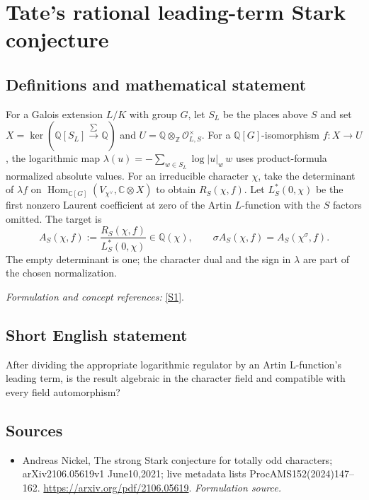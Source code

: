 \documentclass[11pt]{article}
\begin{document}
\section*{\texorpdfstring{Tate's rational leading-term Stark conjecture}{Tate's rational leading-term Stark conjecture}}\label{30006764}
\subsection{Definitions and mathematical statement}
For a Galois extension $L/K$ with group $G$, let $S_L$ be the places above $S$ and set
$X=\ker({\mathbb{Q}}[S_L]\xrightarrow{\sum}{\mathbb{Q}})$ and
$U={\mathbb{Q}}\otimes_{{\mathbb{Z}}}\mathcal O_{L,S}^{\times}$. For a ${\mathbb{Q}}[G]$-isomorphism $f:X\to U$, the logarithmic map
$\lambda(u)=-\sum_{w\in S_L}\log|u|_w\,w$
uses product-formula normalized absolute values. For an irreducible character $\chi$, take the determinant of $\lambda f$ on
$\operatorname{Hom}_{{\mathbb{C}}[G]}(V_{\chi^\vee},{\mathbb{C}}\otimes X)$ to obtain $R_S(\chi,f)$. Let $L_S^*(0,\chi)$ be the first nonzero Laurent coefficient at zero of the Artin $L$-function with the $S$ factors omitted. The target is
\[
 A_S(\chi,f):=\frac{R_S(\chi,f)}{L_S^*(0,\chi)}\in{\mathbb{Q}}(\chi),
 \qquad\sigma A_S(\chi,f)=A_S(\chi^\sigma,f).
\]
The empty determinant is one; the character dual and the sign in $\lambda$ are part of the chosen normalization.
\par\smallskip\textit{Formulation and concept references:} \href{https://arxiv.org/pdf/2106.05619}{[S1]}.

\subsection{Short English statement}
After dividing the appropriate logarithmic regulator by an Artin L-function's leading term, is the result algebraic in the character field and compatible with every field automorphism?
\subsection{Sources}
\begin{itemize}
\item[S1]Andreas Nickel, The strong Stark conjecture for totally odd characters; arXiv2106.05619v1 June10,2021; live metadata lists ProcAMS152(2024)147–162.
\url{https://arxiv.org/pdf/2106.05619}.
\textit{Formulation source.}
\end{itemize}
\end{document}
